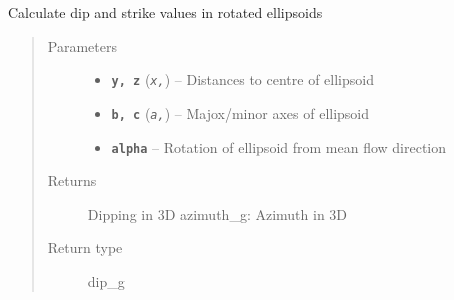 \documentclass[letterpaper,10pt,english]{sphinxmanual}
\begin{document}
\begin{fulllineitems}
\label{hyvr:hyvr.hyvr.sim.ellipsoid_gradient}
Calculate dip and strike values in rotated ellipsoids
\begin{quote}\begin{description}
\item[{Parameters}] \leavevmode\begin{itemize}
\item {} 
\textbf{\texttt{y, z}} (\emph{\texttt{x,}}) -- Distances to centre of ellipsoid

\item {} 
\textbf{\texttt{b, c}} (\emph{\texttt{a,}}) -- Majox/minor axes of ellipsoid

\item {} 
\textbf{\texttt{alpha}} -- Rotation of ellipsoid from mean flow direction

\end{itemize}

\item[{Returns}] \leavevmode
Dipping in 3D
azimuth\_g:              Azimuth in 3D

\item[{Return type}] \leavevmode
dip\_g

\end{description}\end{quote}

\end{fulllineitems}

\end{document}
